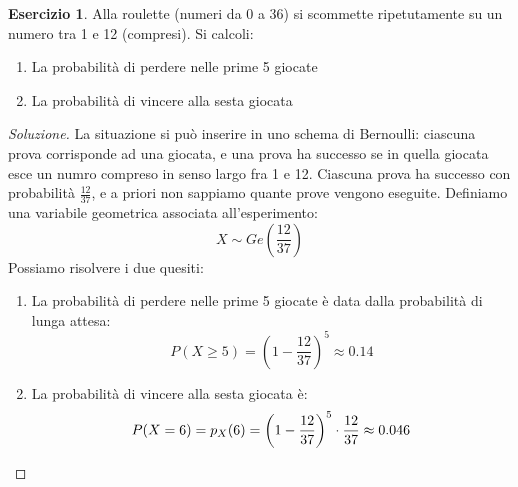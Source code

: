\documentclass{article}
\theoremstyle{plain}
\theoremstyle{definition}
\newtheorem{esercizio}{Esercizio}[section]
\theoremstyle{remark}
\newenvironment{soluzione}
	{\renewcommand\qedsymbol{$\mathwitch*$}\begin{proof}[Soluzione]}
	{\end{proof}}
\renewcommand{\qedsymbol}{$\mathrightghost$}
\begin{document}
\begin{esercizio}
	Alla roulette (numeri da 0 a 36) si scommette ripetutamente su un numero tra 1 e 12 (compresi). Si calcoli:
	\begin{enumerate}
		\item La probabilità di perdere nelle prime 5 giocate
		\item La probabilità di vincere alla sesta giocata
	\end{enumerate}
	\begin{soluzione}
		La situazione si può inserire in uno schema di Bernoulli: ciascuna prova corrisponde ad una giocata, e una prova ha successo se in quella giocata esce un numro compreso in senso largo fra 1 e 12. Ciascuna prova ha successo con probabilità $\frac{12}{37}$, e a priori non sappiamo quante prove vengono eseguite. Definiamo una variabile geometrica associata all'esperimento:
		\begin{equation*}
			X\sim Ge\left(\frac{12}{37}\right)
		\end{equation*}
		Possiamo risolvere i due quesiti:
		\begin{enumerate}
			\item La probabilità di perdere nelle prime 5 giocate è data dalla probabilità di lunga attesa:
			\begin{equation*}
				P(X\geq 5)=\left(1-\frac{12}{37}\right)^5\approx0.14
			\end{equation*}
			\item La probabilità di vincere alla sesta giocata è:
			\begin{equation*}
				P(X=6)=p_X(6)=\left(1-\frac{12}{37}\right)^5\cdot\frac{12}{37}\approx0.046\qedhere
			\end{equation*}
		\end{enumerate}
	\end{soluzione}
\end{esercizio}
\end{document}
